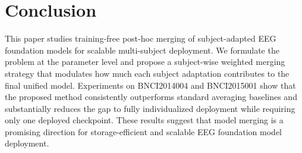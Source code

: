 \documentclass[conference]{IEEEtran}
\begin{document}
\section{Conclusion}
This paper studies training-free post-hoc merging of subject-adapted EEG foundation models for scalable multi-subject deployment. We formulate the problem at the parameter level and propose a subject-wise weighted merging strategy that modulates how much each subject adaptation contributes to the final unified model. Experiments on BNCI2014004 and BNCI2015001 show that the proposed method consistently outperforms standard averaging baselines and substantially reduces the gap to fully individualized deployment while requiring only one deployed checkpoint. These results suggest that model merging is a promising direction for storage-efficient and scalable EEG foundation model deployment.



\end{document}
